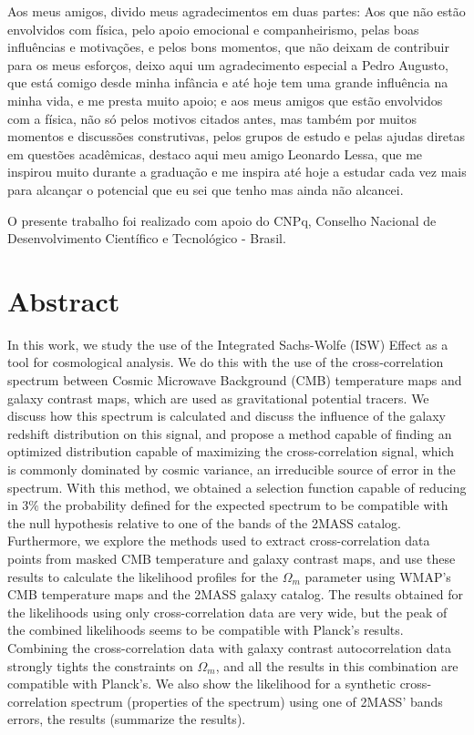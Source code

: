 \documentclass[openany,a4paper,12pt,oneside]{book}
\begin{document}
\begin{spacing}{1.5}
Aos meus amigos, divido meus agradecimentos em duas partes: Aos que não estão envolvidos com física, pelo apoio emocional e companheirismo, pelas boas influências e motivações, e pelos bons momentos, que não deixam de contribuir para os meus esforços, deixo aqui um agradecimento especial a Pedro Augusto, que está comigo desde minha infância e até hoje tem uma grande influência na minha vida, e me presta muito apoio; e aos meus amigos que estão envolvidos com a física, não só pelos motivos citados antes, mas também por muitos momentos e discussões construtivas, pelos grupos de estudo e pelas ajudas diretas em questões acadêmicas, destaco aqui meu amigo Leonardo Lessa, que me inspirou muito durante a graduação e me inspira até hoje a estudar cada vez mais para alcançar o potencial que eu sei que tenho mas ainda não alcancei.

O presente trabalho foi realizado com apoio do CNPq, Conselho Nacional de Desenvolvimento Científico e Tecnológico - Brasil.

\end{spacing}
\endgroup

\chapter*{Abstract}

In this work, we study the use of the Integrated Sachs-Wolfe (ISW) Effect as a tool for cosmological analysis. We do this with the use of the cross-correlation spectrum between Cosmic Microwave Background (CMB) temperature maps and galaxy contrast maps, which are used as gravitational potential tracers. We discuss how this spectrum is calculated and discuss the influence of the galaxy redshift distribution on this signal, and propose a method capable of finding an optimized distribution capable of maximizing the cross-correlation signal, which is commonly dominated by cosmic variance, an irreducible source of error in the spectrum. With this method, we obtained a selection function capable of reducing in $3\%$ the probability defined for the expected spectrum to be compatible with the null hypothesis relative to one of the bands of the 2MASS catalog. Furthermore, we explore the methods used to extract cross-correlation data points from masked CMB temperature and galaxy contrast maps, and use these results to calculate the likelihood profiles for the $\Omega_m$ parameter using WMAP's CMB temperature maps and the 2MASS galaxy catalog. The results obtained for the likelihoods using only cross-correlation data are very wide, but the peak of the combined likelihoods seems to be compatible with Planck's results. Combining the cross-correlation data with galaxy contrast autocorrelation data strongly tights the constraints on $\Omega_m$, and all the results in this combination are compatible with Planck's. We also show the likelihood for a synthetic cross-correlation spectrum (properties of the spectrum) using one of 2MASS' bands errors, the results (summarize the results).
\end{document}
